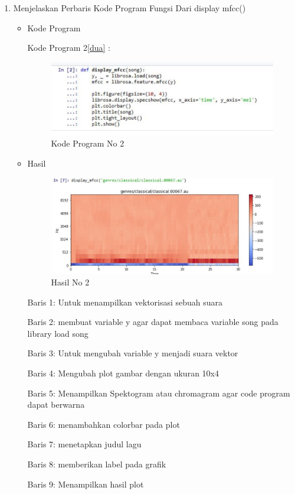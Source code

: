 \begin{enumerate}
\item Menjelaskan Perbaris Kode Program Fungsi Dari display mfcc()
\begin{itemize}
\item Kode Program
\par Kode Program 2\ref{dua} :
\begin{figure}[!hbtp]
\centering
\includegraphics[scale=0.7]{figures/andi/dua.PNG}
\caption{Kode Program No 2}
\label{COntoh Gambar 2}
\end{figure}
\end{itemize}
\begin{itemize}
\item Hasil 
\begin{figure}[!hbtp]
\centering
\includegraphics[scale=0.7]{figures/andi/dua2.PNG}
\caption{Hasil No 2}
\label{Contoh gambar 2}
\end{figure}
\par  Baris 1: Untuk menampilkan vektorisasi sebuah suara
\par  Baris 2: membuat variable y agar dapat membaca variable song pada library load song
\par  Baris 3: Untuk mengubah variable y menjadi suara vektor
\par  Baris 4: Mengubah plot gambar dengan ukuran 10x4
\par  Baris 5: Menampilkan Spektogram atau chromagram agar code program dapat berwarna
\par  Baris 6: menambahkan colorbar pada plot
\par  Baris 7: menetapkan judul lagu
\par  Baris 8: memberikan label pada grafik
\par  Baris 9: Menampilkan hasil plot
\end{itemize}
\par


\end{enumerate}
